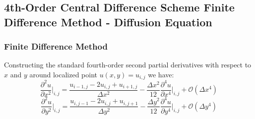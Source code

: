 \documentclass[10pt]{article}		%
\numberwithin{equation}{section}
\newcommand{\psder}[2]{\dfrac{\partial^2#1}{\partial#2^2}}		%
\newcommand{\pfder}[2]{\dfrac{\partial^4#1}{\partial#2^4}}		%
\begin{document}
\newpage

\subsection{4th-Order Central Difference Scheme Finite Difference Method - Diffusion Equation}

\subsubsection{Finite Difference Method}
Constructing the standard fourth-order second partial derivatives with respect to $x$ and $y$ around localized point $u(x,y)=u_{i,j}$ we have:
\begin{equation}
\label{eqn:4oxd}
\psder{u}{x}\Big|_{i,j} = \frac{u_{i-1, j} - 2u_{i,j} + u_{i+1, j}}{\Delta x^2} - \frac{\Delta x^2}{12} \pfder{u}{x}\Big|_{i,j} + \mathcal{O}(\Delta x^4)
\end{equation}
\begin{equation}
\label{eqn:4oyd}
\psder{u}{y}\Big|_{i,j} = \frac{u_{i, j-1} - 2u_{i,j} + u_{i, j+1}}{\Delta y^2} - \frac{\Delta y^2}{12} \pfder{u}{y}\Big|_{i,j} + \mathcal{O}(\Delta y^4)
\end{equation}
\end{document}
